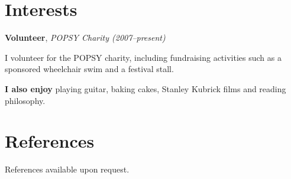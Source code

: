 \documentclass[11pt,a4paper,sans]{moderncv}
\begin{document}
\section{Interests}

{\large\textbf{Volunteer}, \textit{POPSY Charity (2007--present)}}

I volunteer for the POPSY charity, including fundraising activities such as a
sponsored wheelchair swim and a festival stall.

\vspace{0.75em}

{\large\textbf{I also enjoy}} playing guitar, baking cakes,
Stanley Kubrick films and reading philosophy.

\section{References}

References available upon request.
\end{document}
